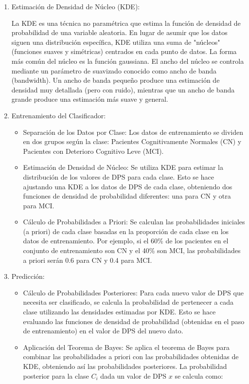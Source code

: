 \begin{enumerate}
	\item Estimación de Densidad de Núcleo (KDE):
	
	La KDE es una técnica no paramétrica que estima la función de densidad de probabilidad de una variable aleatoria. En lugar de asumir que los datos siguen una distribución específica, KDE utiliza una suma de "núcleos" (funciones suaves y simétricas) centrados en cada punto de datos.
	La forma más común del núcleo es la función gaussiana. El ancho del núcleo se controla mediante un parámetro de suavizado conocido como ancho de banda (bandwidth). Un ancho de banda pequeño produce una estimación de densidad muy detallada (pero con ruido), mientras que un ancho de banda grande produce una estimación más suave y general.
	
	\item Entrenamiento del Clasificador:
	\begin{itemize}
		\item Separación de los Datos por Clase: Los datos de entrenamiento se dividen en dos grupos según la clase: Pacientes Cognitivamente Normales (CN) y Pacientes con Deterioro Cognitivo Leve (MCI).
		\item Estimación de Densidad de Núcleo: Se utiliza KDE para estimar la distribución de los valores de DPS para cada clase. Esto se hace ajustando una KDE a los datos de DPS de cada clase, obteniendo dos funciones de densidad de probabilidad diferentes: una para CN y otra para MCI.
		\item Cálculo de Probabilidades a Priori: Se calculan las probabilidades iniciales (a priori) de cada clase basadas en la proporción de cada clase en los datos de entrenamiento. Por ejemplo, si el 60\% de los pacientes en el conjunto de entrenamiento son CN y el 40\% son MCI, las probabilidades a priori serán 0.6 para CN y 0.4 para MCI.
	\end{itemize}
	
	
	\item Predicción:
	\begin{itemize}
		\item Cálculo de Probabilidades Posteriores: Para cada nuevo valor de DPS que necesita ser clasificado, se calcula la probabilidad de pertenecer a cada clase utilizando las densidades estimadas por KDE. Esto se hace evaluando las funciones de densidad de probabilidad (obtenidas en el paso de entrenamiento) en el valor de DPS del nuevo dato.
		\item Aplicación del Teorema de Bayes: Se aplica el teorema de Bayes para combinar las probabilidades a priori con las probabilidades obtenidas de KDE, obteniendo así las probabilidades posteriores. La probabilidad posterior para la clase $C_{i}$ dada un valor de DPS $x$ se calcula como:
		

\end{itemize}
\end{enumerate}
